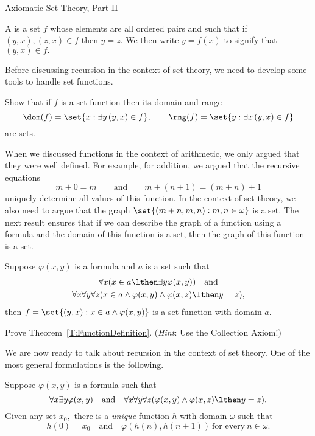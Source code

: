 \begin{unit}{Axiomatic Set Theory, Part II}
\begin{definition}
  A  is a set \(f\) whose elements are all ordered pairs and such that if \((y,x), (z,x) \in f\) then \(y = z.\)
  We then write \(y = f(x)\) to signify that \((y,x) \in f.\)
\end{definition}

\noindent
Before discussing recursion in the context of set theory, we need to develop some tools to handle set functions.

\begin{problem}
  Show that if \(f\) is a set function then its domain and range \[\dom(f) = \set{x : \exists y\,(y,x) \in f}, \qquad \rng(f) = \set{y : \exists x\,(y,x) \in f}\] are sets.
\end{problem}

When we discussed functions in the context of arithmetic, we only argued that they were well defined. 
For example, for addition, we argued that the recursive equations \[m + 0 = m \qquad\text{and}\qquad m + (n + 1) = (m + n) + 1\] uniquely determine all values of this function.
In the context of set theory, we also need to argue that the graph \(\set{(m+n,m,n) : m, n \in \omega}\) is a set.
The next result ensures that if we can describe the graph of a function using a formula and the domain of this function is a set, then the graph of this function is a set.

\begin{theorem}\label{T:FunctionDefinition}
  Suppose \(\varphi(x,y)\) is a formula and \(a\) is a set such that \[\begin{gathered}
    \forall x (x \in a \lthen \exists y \varphi(x,y)) \quad\text{and}\\
    \forall x \forall y \forall z(x \in a \land \varphi(x,y) \land \varphi(x,z) \lthen y = z),
  \end{gathered}\] then \(f = \set{(y,x) : x \in a \land \varphi(x,y)}\) is a set function with domain \(a.\)
\end{theorem}

\begin{problem}
  Prove Theorem~\ref{T:FunctionDefinition}.
  (\textit{Hint}: Use the Collection Axiom!)
\end{problem}

We are now ready to talk about recursion in the context of set theory.
One of the most general formulations is the following.

\begin{theorem}\label{T:FiniteRecursion}
  Suppose \(\varphi(x,y)\) is a formula such that \[\forall x \exists y \varphi(x,y) \quad\text{and}\quad \forall x \forall y \forall z(\varphi(x,y) \land \varphi(x,z) \lthen y = z).\]
  Given any set \(x_0,\) there is a \emph{unique} function \(h\) with domain \(\omega\) such that \[h(0) = x_0 \quad\text{and}\quad \varphi(h(n),h(n+1))\ \text{for every}\ n \in \omega.\] 
\end{theorem}


\end{unit}
